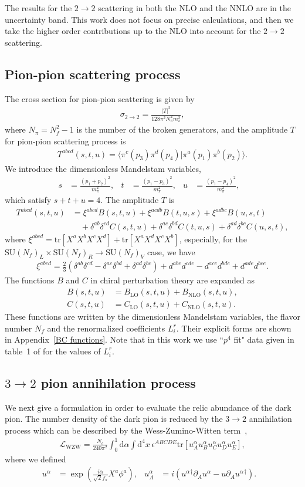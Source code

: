 \documentclass[a4paper,preprint,superscriptaddress,preprintnumbers,nofootinbib]{revtex4}
\newcommand{\SU}{\text{SU}}
\newcommand{\al}[1]{\begin{align}#1\end{align}}
\newcommand{\nn}{\nonumber\\}
\newcommand{\p}{\partial}
\newcommand{\df}{\text{d}}
\newcommand{\fn}[1]{\!\left(#1\right)}
\newcommand{\bra}{\langle}
\newcommand{\ket}{\rangle}
\newcommand{\Lag}{\mathcal L}
\newcommand{\tr}{\text{tr}}
\begin{document}
The results for the $2\to 2$ scattering in both the NLO and the NNLO are in the uncertainty band.
This work does not focus on precise calculations, and then we take the higher order contributions up to the NLO into account for the $2\to 2$ scattering.

\subsection{Pion-pion scattering process}
The cross section for {pion-pion scattering} is given by
\al{
\sigma_{2\to 2}=\frac{|T|^2}{128\pi^2N_\pi^2m_\pi^2},
}
where $N_\pi=N_f^2-1$ is the number of the broken generators, and the amplitude $T$ for {pion-pion scattering} process is
\al{
T^{{abcd}}\fn{s,t,u}=\bra \pi^c\fn{p_3}\pi^d\fn{p_4}| \pi^a\fn{p_1}\pi^b\fn{p_2}\ket.
}
We introduce the dimensionless Mandelstam variables,
\al{
s&=\frac{(p_1+p_2)^2}{m_\pi^2},&
t&=\frac{(p_1-p_3)^2}{m_\pi^2},&
u&=\frac{(p_1-p_4)^2}{m_\pi^2},&
\label{Mandelstam variables stu}
}
which satisfy $s+t+u=4$.
The amplitude $T$ is
\al{
T^{{abcd}}\fn{s,t,u}&=\xi^{abcd}B\fn{s,t,u}+\xi^{acdb}B\fn{t,u,s}+\xi^{adbc}B\fn{u,s,t}\nn
&\quad+\delta^{ab}\delta^{cd}C\fn{s,t,u} + \delta^{ac}\delta^{bd}C\fn{t,u,s}+\delta^{ad}\delta^{bc}C\fn{u,s,t},
}
where $\xi^{abcd}=\tr[X^aX^bX^cX^d] + \tr[X^aX^dX^cX^b]$, especially, for the $\SU\fn{N_f}_L\times \SU\fn{N_f}_R \to \SU\fn{N_f}_V$ case, we have
\al{
\xi^{abcd}=\frac{2}{3}(\delta^{ab}\delta^{cd}-\delta^{ac}\delta^{bd}+\delta^{ad}\delta^{bc})
+d^{abe}d^{cde}-d^{ace}d^{bde}+d^{ade}d^{bce}.
}
The functions $B$ and $C$ in {chiral perturbation theory} are expanded as
\al{
B\fn{s,t,u}&=B_\text{LO}\fn{s,t,u}+B_\text{NLO}\fn{s,t,u},\\
C\fn{s,t,u}&=C_\text{LO}\fn{s,t,u}+C_\text{NLO}\fn{s,t,u}.
}
These functions are written by the dimensionless Mandelstam variables, the flavor number $N_f$ and the renormalized coefficients $L_i^r$.
Their explicit forms are shown in Appendix~\ref{BC functions}.
Note that in this work we use ``$p^4$ fit" data given in table~1 of \cite{Bijnens:2014lea} for the values of $L_i^r$.




\subsection{$3\to 2$ pion annihilation process}
We next give a formulation in order to evaluate the relic abundance of the dark pion.
The number density of the dark pion is reduced by the $3\to 2$ annihilation process which can be described by the Wess-Zumino-Witten term~\cite{Wess:1971yu,Witten:1983tw,Witten:1983tx},
\al{
\Lag_\text{WZW}= \frac{N_c}{240\pi^2}\int_0^1 \df\alpha\int \df^4x\, \epsilon^{ABCDE}\tr[u_A^\alpha u_B^\alpha u_C^\alpha u_D^\alpha u_E^\alpha],
}
where we defined
\al{
u^\alpha&=\exp\fn{\frac{i\alpha}{\sqrt{2}f_\pi}X^a\phi^a},&
u^\alpha_A&=i(u^\alpha{}^\dagger\p_A u^\alpha-u\p_A u^\alpha{}^\dagger).&
}
\end{document}
